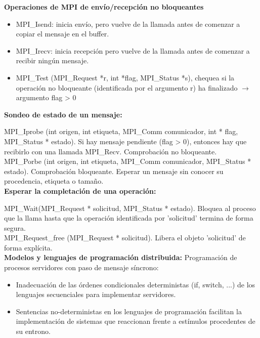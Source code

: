 \documentclass[a4paper,11pt]{article}
\begin{document}
\textbf{Operaciones de MPI de envío/recepción no bloqueantes}

\begin{itemize}
\item MPI\_Isend: inicia envío, pero vuelve de la llamada antes de comenzar a copiar el mensaje en el buffer.

\item MPI\_Irecv: inicia recepción pero vuelve de la llamada antes de comenzar a recibir ningún mensaje.

\item MPI\_Test (MPI\_Request *r, int *flag, MPI\_Status *s), chequea si la operación no bloqueante (identificada por el argumento r) ha finalizado $\rightarrow$ argumento flag > 0
\end{itemize}

\textbf{Sondeo de estado de un mensaje:} 

MPI\_Iprobe (int origen, int etiqueta, MPI\_Comm comunicador, int * flag, MPI\_Status * estado). Si hay mensaje pendiente (flag > 0), entonces hay que recibirlo con una llamada MPI\_Recv. Comprobación no bloqueante. \\

MPI\_Porbe (int origen, int etiqueta, MPI\_Comm comunicador, MPI\_Status * estado). Comprobación bloqueante. Esperar un mensaje sin conocer su procedencia, etiqueta o tamaño. \\

\textbf{Esperar la completación de una operación:}

MPI\_Wait(MPI\_Request * solicitud, MPI\_Status * estado). Bloquea al proceso que la llama hasta que la operación identificada por 'solicitud' termina de forma segura. \\

MPI\_Request\_free (MPI\_Request * solicitud). Libera el objeto 'solicitud' de forma explícita. \\

\textbf{Modelos y lenguajes de programación distribuida:} Programación de procesos servidores con paso de mensaje síncrono:

\begin{itemize}
\item Inadecuación de las órdenes condicionales deterministas (if, switch, ...) de los lenguajes secuenciales para implementar servidores.

\item Sentencias no-deterministas en los lenguajes de programación facilitan la implementación de sistemas que reaccionan frente a estímulos procedentes de su entrono.
\end{itemize}
\end{document}
